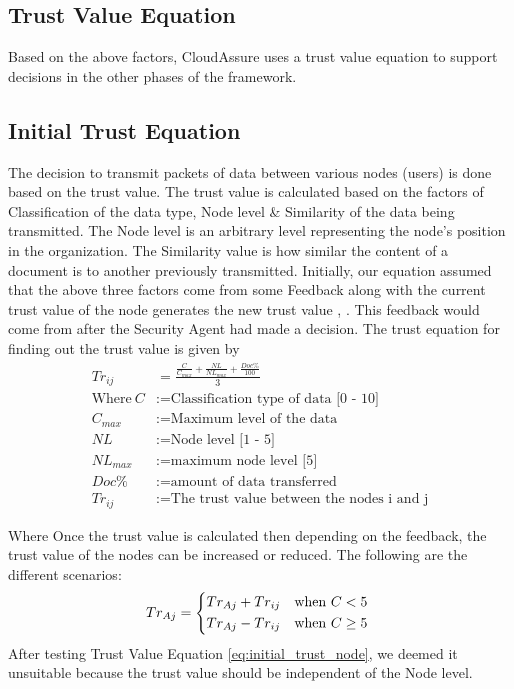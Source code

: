     \subsection{Trust Value Equation}
Based on the above factors, CloudAssure uses a trust value equation to support decisions in the other phases of the framework. 


\subsection{Initial Trust Equation}
The decision to transmit packets of data between various nodes (users) is done
based on the trust value. The trust value is calculated based on the factors of
Classification of the data type, Node level \& Similarity of the data being transmitted. The Node level is an arbitrary level representing the node's position in the organization. The Similarity value is how similar the content of a document is to another previously transmitted.
Initially, our equation assumed that the above three factors come from some
Feedback along with the current trust value of the node generates the new trust
value \autocite{L.Xiong2004}, \autocite{YanWang2007}. This feedback would come from after the Security Agent had made
a decision. The trust equation for finding out the trust value is given by
\begin{equation}
    \label{eq:init_trust}
    \begin{aligned}
         Tr_{ij}&=\frac{\frac{C}{C_{max}} + \frac{NL}{NL_{max}}
         + \frac{Doc\%}{100}}{3} \\
    \text{Where}~C &:= \text{Classification type of data [0 - 10]} \\
C_{max} &:= \text{Maximum level of the data} \\
NL &:= \text{Node level [1 - 5]} \\
NL_{max} &:= \text{maximum node level [5]} \\
Doc\% &:= \text{amount of data transferred} \\
Tr_{ij} &:= \text{The trust value between the nodes i and j}
\end{aligned}
\end{equation}



Where 
Once the trust value is calculated then depending on the feedback, the trust
value of the nodes can be increased or reduced. The following are the different
scenarios: 
\begin{equation}
   Tr_{Aj} =    \begin{dcases*}
                    Tr_{Aj} + Tr_{ij} & when $C < 5$\\
                    Tr_{Aj} - Tr_{ij} & when $C \ge 5$
                \end{dcases*}
                \label{eq:initial_trust_node}
\end{equation}
After testing Trust Value Equation \ref{eq:initial_trust_node}, we deemed it unsuitable because the trust value should be independent of the Node level. 



